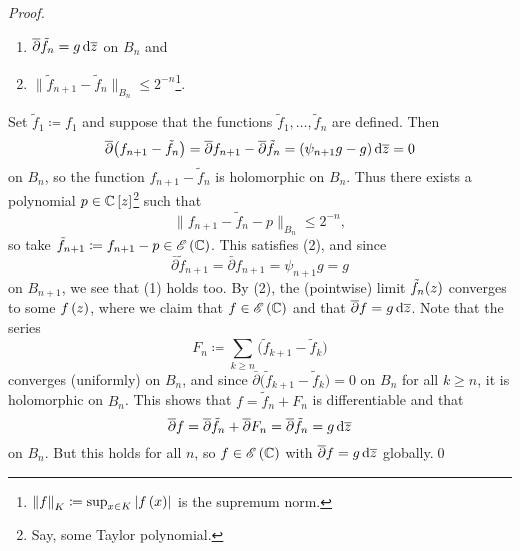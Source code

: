 \documentclass[../Moduli_Spaces_of_Riemann_Surfaces.tex]{subfiles}
\begin{document}
\begin{proof}
        \begin{enumerate}
            \item $\overline{\partial}\tilde{f}_n=g\,\mathrm{d}\overline{z}$ on $B_n$ and
                \vspace{-0.05in}
            \item $\big\|\tilde{f}_{n+1}-\tilde{f}_n\big\|_{B_n}\!\leq 2^{-n}$\footnote{$\left\|f\right\|_K\coloneqq\sup_{x\in K}\left|f\left(x\right)\right|$ is the supremum norm.}.
        \end{enumerate}
        Set $\tilde{f}_1\coloneqq f_1$ and suppose that the functions $\tilde{f}_1,\dots,\tilde{f}_n$ are defined. Then
        \begin{equation*}
            \overline{\partial}\big(f_{n+1}-\tilde{f}_n\big)=\overline{\partial}f_{n+1}-\overline\partial\tilde{f}_n=\left(\psi_{n+1}g-g\right)\mathrm{d}\overline{z}=0
        \end{equation*}
        on $B_n$, so the function $f_{n+1}-\tilde{f}_n$ is holomorphic on $B_n$. Thus there exists a polynomial $p\in\mathbb{C}\left[z\right]$\footnote{Say, some Taylor polynomial.} such that
        \begin{equation*}
            \big\|f_{n+1}-\tilde{f}_n-p\big\|_{B_n}\!\leq 2^{-n},
        \end{equation*}
        so take $\tilde{f}_{n+1}\coloneqq f_{n+1}-p\in\mathscr{E}\left(\mathbb{C}\right)$. This satisfies (2), and since
        \begin{equation*}
            \bar{\partial}\tilde{f}_{n+1}=\bar{\partial}f_{n+1}=\psi_{n+1}g=g
        \end{equation*}
        on $B_{n+1}$, we see that (1) holds too. By (2), the (pointwise) limit $\tilde{f}_n\!\left(z\right)$ converges to some $f\left(z\right)$, where we claim that  $f\in\mathscr{E}\left(\mathbb{C}\right)$ and that $\overline{\partial}f=g\,\mathrm{d}\overline{z}$. Note that the series
        \begin{equation*}
            F_n\coloneqq\sum_{k\geq n}\big(\tilde{f}_{k+1}-\tilde{f}_k\big)
        \end{equation*}
        converges (uniformly) on $B_n$, and since $\bar{\partial}\big(\tilde{f}_{k+1}-\tilde{f}_k\big)=0$ on $B_n$ for all $k\geq n$, it is holomorphic on $B_n$. This shows that $f=\tilde{f}_n+F_n$ is differentiable and that
        \begin{equation*}
            \overline{\partial}f=\overline{\partial}\tilde{f}_n+\overline{\partial}F_n=\overline{\partial}\tilde{f}_n=g\,\mathrm{d}\overline{z}
        \end{equation*}
        on $B_n$. But this holds for all $n$, so $f\in\mathscr{E}\left(\mathbb{C}\right)$ with $\overline{\partial}f=g\,\mathrm{d}\overline{z}$ globally.\qed
    \end{proof}
\end{document}
